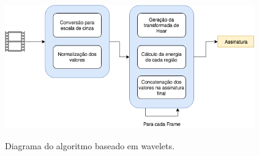 

 \begin{figure}[h]
      \centering
      \caption{Diagrama do algoritmo baseado em wavelets.}
      \includegraphics[width=0.96\textwidth]{dados/figuras/diagramas/Diag-Wavelets}
       	\label{fig:dia_wavelet}
    \end{figure}  



